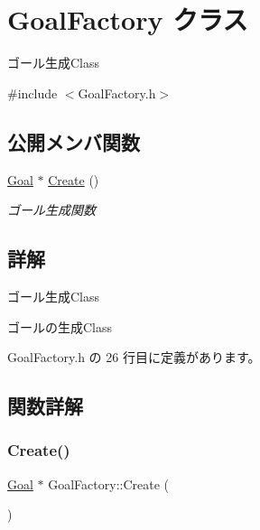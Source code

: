 \hypertarget{class_goal_factory}{}\section{Goal\+Factory クラス}
\label{class_goal_factory}


ゴール生成\+Class  




{\ttfamily \#include $<$Goal\+Factory.\+h$>$}

\subsection*{公開メンバ関数}
\begin{DoxyCompactItemize}
\item 
\mbox{\hyperlink{class_goal}{Goal}} $\ast$ \mbox{\hyperlink{class_goal_factory_a1af3aeec48c6f7ee510a8e8eaca299f1}{Create}} ()
\begin{DoxyCompactList}\small\item\em ゴール生成関数 \end{DoxyCompactList}\end{DoxyCompactItemize}


\subsection{詳解}
ゴール生成\+Class 

ゴールの生成\+Class 

 Goal\+Factory.\+h の 26 行目に定義があります。



\subsection{関数詳解}
\mbox{\label{class_goal_factory_a1af3aeec48c6f7ee510a8e8eaca299f1}} 
\subsubsection{\texorpdfstring{Create()}{Create()}}
{\footnotesize\ttfamily \mbox{\hyperlink{class_goal}{Goal}} $\ast$ Goal\+Factory\+::\+Create (\begin{DoxyParamCaption}{ }\end{DoxyParamCaption})}




